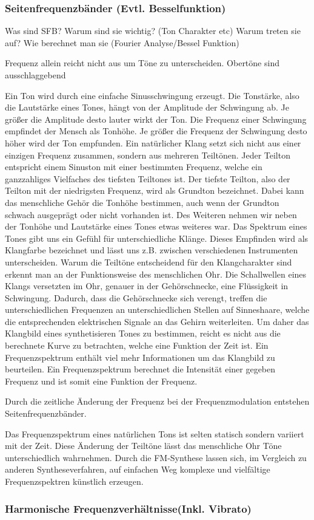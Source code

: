 \subsubsection{Seitenfrequenzbänder (Evtl. Besselfunktion)}
Was sind SFB?
Warum sind sie wichtig? (Ton Charakter etc)
Warum treten sie auf?
Wie berechnet man sie (Fourier Analyse/Bessel Funktion)

Frequenz allein reicht nicht aus um Töne zu unterscheiden. Obertöne sind ausschlaggebend 

Ein Ton wird durch eine einfache Sinusschwingung erzeugt. Die Tonstärke, also die Lautstärke eines Tones, hängt von der Amplitude der Schwingung ab. Je größer die Amplitude desto lauter wirkt der Ton. Die Frequenz einer Schwingung empfindet der Mensch als Tonhöhe. Je größer die Frequenz der Schwingung desto höher wird der Ton empfunden. 
Ein natürlicher Klang setzt sich nicht aus einer einzigen Frequenz zusammen, sondern aus mehreren Teiltönen. Jeder Teilton entspricht einem Sinuston mit einer bestimmten Frequenz, welche ein ganzzahliges Vielfaches des tiefsten Teiltones ist. Der tiefste Teilton, also der Teilton mit der niedrigsten Frequenz, wird als Grundton bezeichnet. \cite[S. 87]{borucki} 
Dabei kann das menschliche Gehör die Tonhöhe bestimmen, auch wenn der Grundton schwach ausgeprägt oder nicht vorhanden ist. \cite[S. 4]{zwicker} Des Weiteren nehmen wir neben der Tonhöhe und Lautstärke eines Tones etwas weiteres war. Das Spektrum eines Tones gibt uns ein Gefühl für unterschiedliche Klänge. Dieses Empfinden wird als Klangfarbe bezeichnet und lässt uns z.B. zwischen verschiedenen Instrumenten unterscheiden. \cite[S. 5]{zwicker} \cite[S. 226]{raichel}
Warum die Teiltöne entscheidend für den Klangcharakter sind erkennt man an der Funktionsweise des menschlichen Ohr. Die Schallwellen eines Klangs versetzten im Ohr, genauer in der Gehörschnecke, eine Flüssigkeit in Schwingung. Dadurch, dass die Gehörschnecke sich verengt, treffen die unterschiedlichen Frequenzen an unterschiedlichen Stellen auf Sinneshaare, welche die entsprechenden elektrischen Signale an das Gehirn weiterleiten. \cite[S. 87 f.]{zwicker} Um daher das Klangbild eines synthetisieren Tones zu bestimmen, reicht es nicht aus die berechnete Kurve zu betrachten, welche eine Funktion der Zeit ist. Ein Frequenzspektrum enthält viel mehr Informationen um das Klangbild zu beurteilen. Ein Frequenzspektrum berechnet die Intensität einer gegeben Frequenz und ist somit eine Funktion der Frequenz.



Durch die zeitliche Änderung der Frequenz bei der Frequenzmodulation entstehen Seitenfrequenzbänder.


Das Frequenzspektrum eines natürlichen Tons ist selten statisch sondern variiert mit der Zeit. Diese Änderung der Teiltöne lässt das menschliche Ohr Töne unterschiedlich wahrnehmen. Durch die FM-Synthese lassen sich, im Vergleich zu anderen Syntheseverfahren, auf einfachen Weg komplexe und vielfältige Frequenzspektren künstlich erzeugen.


\subsubsection{Harmonische Frequenzverhältnisse(Inkl. Vibrato)}
